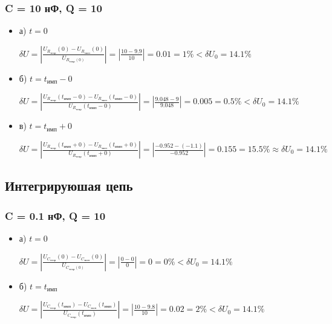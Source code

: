 \documentclass[a4paper,14pt]{extarticle}
\begin{document}
\subsubsection{C = 10 нФ, Q = 10}

\begin{itemize}
\item[] а) $t = 0$

	$\delta U = \left| \frac{U_{R_\text{теор}}(0) - U_{R_\text{эксп}}(0)}{U_{R_\text{теор}(0)}} \right| = \left| \frac{10 - 9.9}{10} \right| = 0.01 = 1\% < \delta U_0 = 14.1\%$

\item[] б) $t = t_\text{имп}-0$

	$\delta U = \left| \frac{U_{R_\text{теор}}(t_\text{имп}-0) - U_{R_\text{эксп}}(t_\text{имп}-0)}{U_{R_\text{теор}}(t_\text{имп}-0)} \right| = \left| \frac{9.048 - 9}{9.048} \right| = 0.005 = 0.5\% < \delta U_0 = 14.1\%$

\item[] в) $t = t_\text{имп}+0$

	$\delta U = \left| \frac{U_{R_\text{теор}}(t_\text{имп}+0) - U_{R_\text{эксп}}(t_\text{имп}+0)}{U_{R_\text{теор}}(t_\text{имп}+0)} \right| = \left| \frac{-0.952 - (-1.1)}{-0.952} \right| = 0.155 = 15.5\% \approx \delta U_0 = 14.1\%$
\end{itemize}

\subsection{Интегрируюшая цепь}

\subsubsection{C = 0.1 нФ, Q = 10}

\begin{itemize}
\item[] а) $t = 0$

	$\delta U = \left| \frac{U_{C_\text{теор}}(0) - U_{C_\text{эксп}}(0)}{U_{C_\text{теор}(0)}} \right| = \left| \frac{0 - 0}{0} \right| = 0 = 0\% < \delta U_0 = 14.1\%$

\item[] б) $t = t_\text{имп}$

	$\delta U = \left| \frac{U_{C_\text{теор}}(t_\text{имп}) - U_{C_\text{эксп}}(t_\text{имп})}{U_{C_\text{теор}}(t_\text{имп})} \right| = \left| \frac{10 - 9.8}{10} \right| = 0.02 = 2\% < \delta U_0 = 14.1\%$
\end{itemize}
\end{document}

